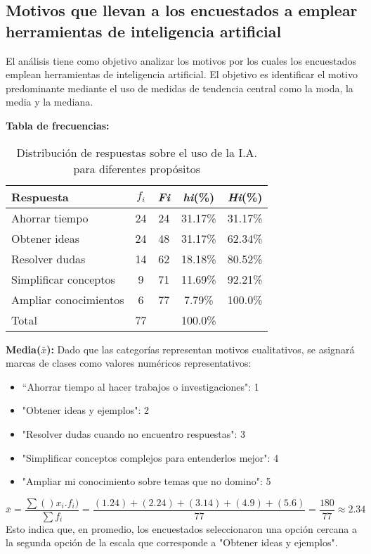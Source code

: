 \subsection{Motivos que llevan a los encuestados a emplear herramientas de inteligencia artificial}

El análisis tiene como objetivo analizar los motivos por los cuales los encuestados emplean herramientas de inteligencia artificial. El objetivo es identificar el motivo predominante mediante el uso de medidas de tendencia central como la moda, la media y la mediana.

\textbf{Tabla de frecuencias:}
\begin{table}[H]
	\centering
	\renewcommand{\arraystretch}{1.2}
	\begin{tabular}{l c c c c}
		\hline
		{Respuesta} & {\(f_i\)} & \textit{Fi} & \textit{hi}(\%) & \textit{Hi}(\%)\\
		\hline
		Ahorrar tiempo        & 24 & 24 & 31.17\% & 31.17\%\\
		Obtener ideas         & 24 & 48 & 31.17\% & 62.34\%\\
		Resolver dudas        & 14 & 62 & 18.18\% & 80.52\%\\
		Simplificar conceptos & 9  & 71 & 11.69\% & 92.21\%\\
		Ampliar conocimientos & 6  & 77 & 7.79\%  & 100.0\%\\
		\hline
		Total                 & 77 &    & 100.0\%\\
		\hline
	\end{tabular}
	\caption{Distribución de respuestas sobre el uso de la I.A. para diferentes propósitos}
	\label{tabla:motivos}
\end{table}

\textbf{Media($\bar{x}$):} Dado que las categorías representan motivos cualitativos, se asignará marcas de clases como valores numéricos representativos:
\begin{itemize}
	\item “Ahorrar tiempo al hacer trabajos o investigaciones": 1
	\item "Obtener ideas y ejemplos": 2
	\item "Resolver dudas cuando no encuentro respuestas": 3
	\item "Simplificar conceptos complejos para entenderlos mejor": 4
	\item "Ampliar mi conocimiento sobre temas que no domino": 5
\end{itemize}
\begin{equation*}
	\bar{x} = \dfrac{\sum ()x_i . f_i)}{\sum f_i} = \dfrac{(1 . 24)+ (2 . 24) + (3 . 14) + (4 . 9) + (5 . 6)}{77} = \dfrac{180}{77} \approx 2.34
\end{equation*}
Esto indica que, en promedio, los encuestados seleccionaron una opción cercana a la segunda opción de la escala que corresponde a "Obtener ideas y ejemplos".

